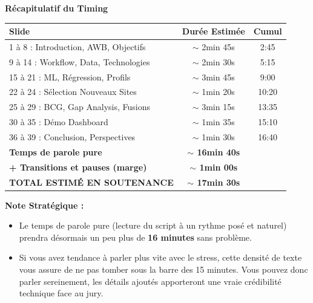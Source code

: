 \documentclass[11pt,a4paper]{article}
\begin{document}
\newpage
\begin{center}
{\Large\bfseries\color{accent} Récapitulatif du Timing}
\end{center}
\vspace{0.3cm}

\begin{center}
\renewcommand{\arraystretch}{1.3}
\begin{tabular}{|l|c|c|}
\hline
\textbf{Slide} & \textbf{Durée Estimée} & \textbf{Cumul} \\
\hline
1 à 8 : Introduction, AWB, Objectifs & $\sim$ 2min 45s & 2:45 \\
9 à 14 : Workflow, Data, Technologies & $\sim$ 2min 30s & 5:15 \\
15 à 21 : ML, Régression, Profils & $\sim$ 3min 45s & 9:00 \\
22 à 24 : Sélection Nouveaux Sites & $\sim$ 1min 20s & 10:20 \\
25 à 29 : BCG, Gap Analysis, Fusions & $\sim$ 3min 15s & 13:35 \\
30 à 35 : Démo Dashboard & $\sim$ 1min 35s & 15:10 \\
36 à 39 : Conclusion, Perspectives & $\sim$ 1min 30s & 16:40 \\
\hline
\textbf{Temps de parole pure} & \textbf{$\sim$ 16min 40s} & \\
\textbf{+ Transitions et pauses (marge)} & \textbf{$\sim$ 1min 00s} & \\
\hline
\textbf{TOTAL ESTIMÉ EN SOUTENANCE} & \textbf{$\sim$ 17min 30s} & \\
\hline
\end{tabular}
\end{center}

\vspace{0.3cm}
{\color{tip}\textbf{Note Stratégique :}}
\begin{itemize}
  \item Le temps de parole pure (lecture du script à un rythme posé et naturel) prendra désormais un peu plus de \textbf{16 minutes} sans problème. 
  \item Si vous avez tendance à parler plus vite avec le stress, cette densité de texte vous assure de ne pas tomber sous la barre des 15 minutes. Vous pouvez donc parler sereinement, les détails ajoutés apporteront une vraie crédibilité technique face au jury.
\end{itemize}
\end{document}
